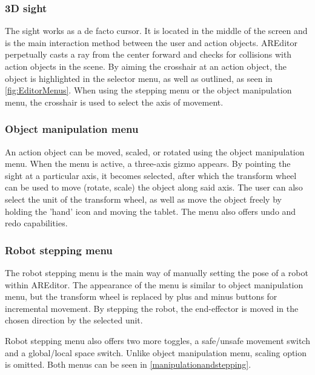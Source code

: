 \subsubsection{3D sight}
The sight works as a de facto cursor. It is located in the middle of the screen and is the main interaction method between the user and action objects. AREditor perpetually casts a ray from the center forward and checks for collisions with action objects in the scene. By aiming the crosshair at an action object, the object is highlighted in the selector menu, as well as outlined, as seen in \ref{fig:EditorMenus}. When using the stepping menu or the object manipulation menu, the crosshair is used to select the axis of movement. 

\subsubsection{Object manipulation menu}
An action object can be moved, scaled, or rotated using the object manipulation menu. When the menu is active, a three-axis gizmo appears. By pointing the sight at a particular axis, it becomes selected, after which the transform wheel can be used to move (rotate, scale) the object along said axis. The user can also select the unit of the transform wheel, as well as move the object freely by holding the 'hand' icon and moving the tablet. The menu also offers undo and redo capabilities.


\subsubsection{Robot stepping menu}
The robot stepping menu is the main way of manually setting the pose of a robot within AREditor. The appearance of the menu is similar to object manipulation menu, but the transform wheel is replaced by plus and minus buttons for incremental movement. By stepping the robot, the end-effector is moved in the chosen direction by the selected unit. 

Robot stepping menu also offers two more toggles, a safe/unsafe movement switch and a global/local space switch. Unlike object manipulation menu, scaling option is omitted. Both menus can be seen in \ref{manipulationandstepping}.

